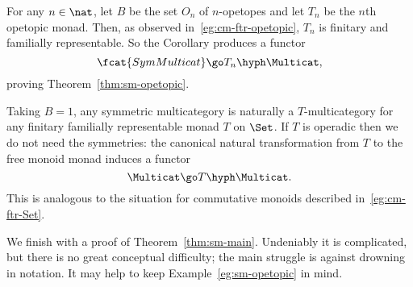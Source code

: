 \begin{example}	
For any $n\in\nat$, let $B$ be the set $O_n$ of $n$-opetopes and let $T_n$
be the $n$th opetopic%
%
%
monad.  Then, as observed
in~\ref{eg:cm-ftr-opetopic}, $T_n$ is finitary and familially
representable.  So the Corollary produces a functor
\[
\fcat{SymMulticat} \go T_n\hyph\Multicat,
\]
proving Theorem~\ref{thm:sm-opetopic}. 
\end{example}

\begin{example}
Taking $B=1$, any symmetric multicategory is naturally a $T$-multicategory
for any finitary familially representable monad $T$ on $\Set$.  If $T$ is
operadic%
%
%
then we do not need the symmetries: the canonical natural
transformation from $T$ to the free monoid monad induces a functor
\[
\Multicat \go T\hyph\Multicat.
\]
This is analogous to the situation for commutative monoids described
in~\ref{eg:cm-ftr-Set}.
\end{example}

We finish with a proof of Theorem~\ref{thm:sm-main}.  Undeniably it is
complicated, but there is no great conceptual difficulty; the main struggle
is against drowning in notation.  It may help to keep
Example~\ref{eg:sm-opetopic} in mind.

